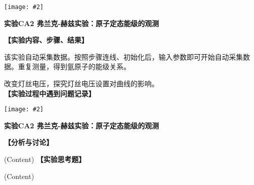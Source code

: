 \documentclass[11pt,a4paper]{ctexart}
\newcommand{\ExpeName}{实验CA2 弗兰克-赫兹实验：原子定态能级的观测}
\newcommand{\cpic}[2]{
\begin{center}
\texttt{[image: \#2]}
\end{center}
}
\begin{document}
\newpage%
\cpic{0.255}{e2}%
\begin{center}
\LARGE{\textbf{\ExpeName}}
\end{center}
\textbf{【实验内容、步骤、结果】}\par
该实验自动采集数据。按照步骤连线、初始化后，输入参数即可开始自动采集数据。重复测量，得到氩原子的能级关系。
\par
改变灯丝电压，探究灯丝电压设置对曲线的影响。
\newline 
\ 
\\
\textbf{【实验过程中遇到问题记录】}

%

\newpage%
\cpic{0.255}{e3}%
\begin{center}
\LARGE\textbf{{\ExpeName}}
\end{center}
\textbf{【分析与讨论】}\par
(Content)
\newline
\textbf{【实验思考题】}\par
(Content)
\end{document}
